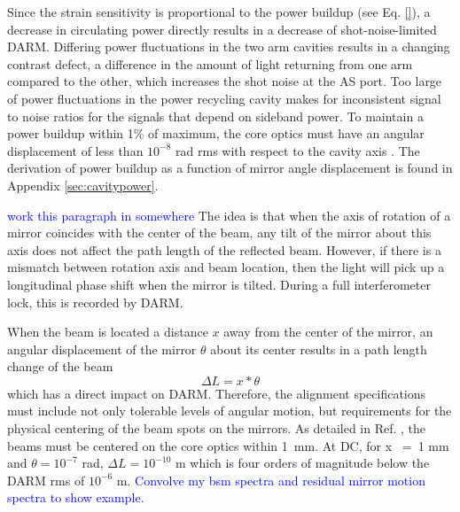 Since the strain sensitivity is proportional to the power buildup (see Eq. \ref{}), a decrease in circulating power directly results in a decrease of shot-noise-limited DARM. Differing power fluctuations in the two arm cavities results in a changing contrast defect, a difference in the amount of light returning from one arm compared to the other, which increases the shot noise at the AS port. Too large of power fluctuations in the power recycling cavity makes for inconsistent signal to noise ratios for the signals that depend on sideband power. To maintain a power buildup within 1\% of maximum, the core optics must have an angular displacement of less than $10^{-8}$ rad rms with respect to the cavity axis \cite{ISCGroup1998ASC}. The derivation of power buildup as a function of mirror angle displacement is found in Appendix \ref{sec:cavitypower}.


\textcolor{blue}{work this paragraph in somewhere}
The idea is that when the axis of rotation of a mirror coincides with the center of the beam, any tilt of the mirror about this axis does not affect the path length of the reflected beam. However, if there is a mismatch between rotation axis and beam location, then the light will pick up a longitudinal phase shift when the mirror is tilted. During a full interferometer lock, this is recorded by DARM.



When the beam is located a distance $x$ away from the center of the mirror, an
angular displacement of the mirror $\theta$ about its center results in a path
length change of the beam
\begin{equation}
\Delta{L} = x * \theta
\end{equation}
which has a direct impact on DARM. Therefore, the alignment specifications must include not only tolerable levels of angular motion, but requirements for the physical centering of the beam spots on the mirrors. As detailed in Ref. \cite{ISCGroup1998ASC}, the beams must be centered on the core optics within 1~mm. At DC, for x ~=~1 mm and $\theta = 10^{-7}$ rad, $\Delta{L} = 10^{-10}$ m which is four orders of magnitude below the DARM rms of $10^{-6}$ m. \textcolor{blue}{Convolve my bsm spectra and residual mirror motion spectra to show example.}



